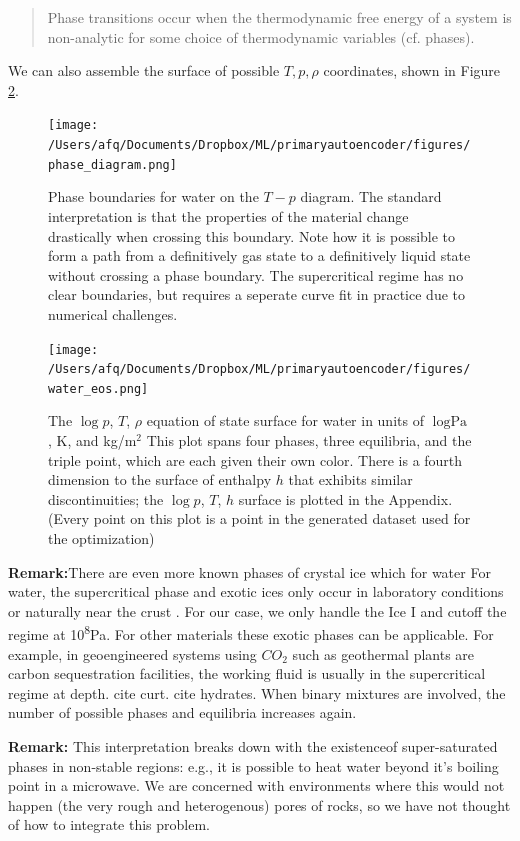 \documentclass[]{article}
\begin{document}
\begin{quote}
Phase transitions occur when the thermodynamic free energy of a system
is non-analytic for some choice of thermodynamic variables (cf. phases).
\end{quote}

We can also assemble the surface of possible $T,p,\rho$ coordinates,
shown in Figure \ref{fig:pTrho}.
\begin{figure}
\centering
\texttt{[image: /Users/afq/Documents/Dropbox/ML/primaryautoencoder/figures/phase\_diagram.png]}
\caption{\label{fig:phaseboundaries}Phase boundaries for water on the $T-p$ diagram. The standard
interpretation is that the properties of the material change
drastically when crossing this boundary. Note how it is possible to form a path from a
definitively gas state to a definitively liquid state without crossing
a phase boundary. The supercritical regime has no clear boundaries,
but requires a seperate curve fit in practice due to numerical challenges.}
\end{figure}

\begin{figure}
\centering
\texttt{[image: /Users/afq/Documents/Dropbox/ML/primaryautoencoder/figures/water\_eos.png]}
\caption{\label{fig:pTrho} The $\log{p}$, $T$, $\rho$ equation of
  state surface for water in units of $\log{\text{Pa}}$, K, and \si{}{kg/m$^2$} This plot spans four phases, three
  equilibria, and the triple point, which are each given their own color.
  There is a fourth dimension to the surface of enthalpy $h$ that exhibits
  similar discontinuities; the $\log{p}$, $T$, $h$ surface is plotted
  in the Appendix. (Every point on this plot is a point in the
  generated dataset used for the optimization)}
\end{figure}

{\bf Remark:}There are even more known phases of crystal ice which for water
For water, the supercritical phase and exotic ices only occur in
laboratory conditions or naturally near the
crust \cite{}. For our case, we only handle the Ice I and cutoff the
regime at \si{10^8}{Pa}. For other materials these exotic phases can be
applicable. For example, in geoengineered systems using $CO_2$
such as geothermal plants are carbon sequestration facilities, the
working fluid is usually in the supercritical regime at depth. cite
curt. cite hydrates.
When binary mixtures are involved, the number of possible phases and
equilibria increases again.

{\bf Remark:} This interpretation breaks down with the existenceof super-saturated phases in non-stable regions: e.g., it is possible to
heat water beyond it's boiling point in a microwave. We are concerned
with environments where this would not happen (the very rough and
heterogenous) pores of rocks, so we have not thought of how to
integrate this problem.
\end{document}
